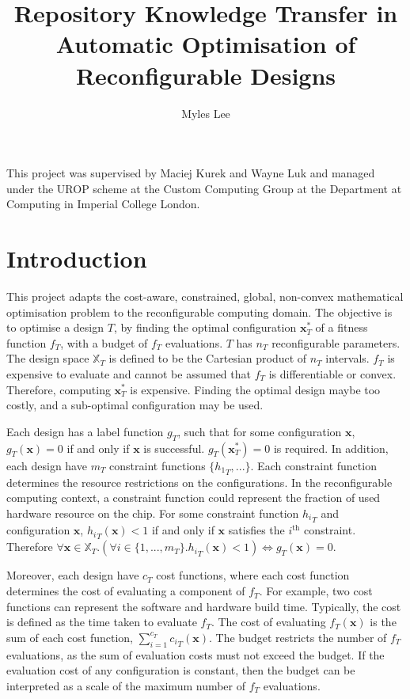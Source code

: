 \documentclass[10pt,a4paper]{article}
\author{Myles Lee}
\title{Repository Knowledge Transfer in Automatic Optimisation of Reconfigurable Designs}
\begin{document}
\maketitle
This project was supervised by Maciej Kurek and Wayne Luk and managed under the UROP scheme at the Custom Computing Group at the Department at Computing in Imperial College London.

\section{Introduction}
This project adapts the cost-aware, constrained, global, non-convex mathematical optimisation problem to the reconfigurable computing domain. The objective is to optimise a design $T$, by finding the optimal configuration $\mathbf{x}_T^*$ of a fitness function $f_T$, with a budget of $f_T$ evaluations. $T$ has $n_T$ reconfigurable parameters. The design space $\mathbb{X}_T$ is defined to be the Cartesian product of $n_T$ intervals. $f_T$ is expensive to evaluate and cannot be assumed that $f_T$ is differentiable or convex. Therefore, computing $\mathbf{x}_T^*$ is expensive. Finding the optimal design maybe too costly, and a sub-optimal configuration may be used.

Each design has a label function $g_T$, such that for some configuration $\mathbf{x}$, $g_T(\mathbf{x})=0$ if and only if $\mathbf{x}$ is successful. $g_T(\mathbf{x}_T^*)=0$ is required. In addition, each design have $m_T$ constraint functions $\{{h_1}_T,...\}$. Each constraint function determines the resource restrictions on the configurations. In the reconfigurable computing context, a constraint function could represent the fraction of used hardware resource on the chip. For some constraint function ${h_i}_T$ and configuration $\mathbf{x}$, ${h_i}_T(\mathbf{x})<1$ if and only if $\mathbf{x}$ satisfies the $i^{\text{th}}$ constraint. Therefore $\forall \mathbf{x}\in\mathbb{X}_T.(\forall i\in\{1,...,m_T\}.{h_i}_T(\mathbf{x})<1)\Leftrightarrow g_T(\mathbf{x})=0$.

Moreover, each design have $c_T$ cost functions, where each cost function determines the cost of evaluating a component of $f_T$. For example, two cost functions can represent the software and hardware build time. Typically, the cost is defined as the time taken to evaluate $f_T$. The cost of evaluating $f_T(\mathbf{x})$ is the sum of each cost function, $\sum_{i=1}^{c_T}{c_i}_T(\mathbf{x})$. The budget restricts the number of $f_T$ evaluations, as the sum of evaluation costs must not exceed the budget. If the evaluation cost of any configuration is constant, then the budget can be interpreted as a scale of the maximum number of $f_T$ evaluations.
\end{document}
